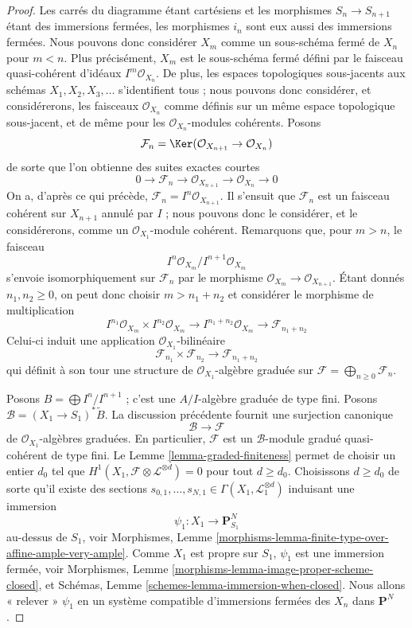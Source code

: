 \begin{proof}
Les carrés du diagramme étant cartésiens et les morphismes
$S_n \to S_{n + 1}$ étant des immersions fermées, les morphismes $i_n$ sont
eux aussi des immersions fermées. Nous pouvons donc considérer $X_m$ comme un
sous-schéma fermé de $X_n$ pour $m < n$. Plus précisément, $X_m$ est le
sous-schéma fermé défini par le faisceau quasi-cohérent d'idéaux
$I^m\mathcal{O}_{X_n}$. De plus, les espaces topologiques sous-jacents aux
schémas $X_1, X_2, X_3, \ldots$ s'identifient tous ; nous pouvons donc
considérer, et considérerons, les faisceaux $\mathcal{O}_{X_n}$ comme définis
sur un même espace topologique sous-jacent, et de même pour les
$\mathcal{O}_{X_n}$-modules cohérents. Posons
$$
\mathcal{F}_n =
\Ker(\mathcal{O}_{X_{n + 1}} \to \mathcal{O}_{X_n})
$$
de sorte que l'on obtienne des suites exactes courtes
$$
0 \to \mathcal{F}_n \to \mathcal{O}_{X_{n + 1}} \to \mathcal{O}_{X_n} \to 0
$$
On a, d'après ce qui précède,
$\mathcal{F}_n = I^n\mathcal{O}_{X_{n + 1}}$. Il s'ensuit que
$\mathcal{F}_n$ est un faisceau cohérent sur $X_{n + 1}$ annulé par $I$ ;
nous pouvons donc le considérer, et le considérerons, comme un
$\mathcal{O}_{X_1}$-module cohérent. Remarquons que, pour $m > n$, le faisceau
$$
I^n\mathcal{O}_{X_m}/I^{n + 1}\mathcal{O}_{X_m}
$$
s'envoie isomorphiquement sur $\mathcal{F}_n$ par le morphisme
$\mathcal{O}_{X_m} \to \mathcal{O}_{X_{n + 1}}$. Étant donnés
$n_1, n_2 \geq 0$, on peut donc choisir $m > n_1 + n_2$ et considérer le
morphisme de multiplication
$$
I^{n_1}\mathcal{O}_{X_m} \times I^{n_2}\mathcal{O}_{X_m}
\longrightarrow
I^{n_1 + n_2}\mathcal{O}_{X_m} \to \mathcal{F}_{n_1 + n_2}
$$
Celui-ci induit une application $\mathcal{O}_{X_1}$-bilinéaire
$$
\mathcal{F}_{n_1} \times \mathcal{F}_{n_2} \longrightarrow
\mathcal{F}_{n_1 + n_2}
$$
qui définit à son tour une structure de $\mathcal{O}_{X_1}$-algèbre graduée
sur $\mathcal{F} = \bigoplus_{n \geq 0} \mathcal{F}_n$.

\medskip\noindent
Posons $B = \bigoplus I^n/I^{n + 1}$ ; c'est une $A/I$-algèbre graduée de
type fini. Posons $\mathcal{B} = (X_1 \to S_1)^*\widetilde{B}$. La discussion
précédente fournit une surjection canonique
$$
\mathcal{B} \longrightarrow \mathcal{F}
$$
de $\mathcal{O}_{X_1}$-algèbres graduées. En particulier,
$\mathcal{F}$ est un $\mathcal{B}$-module gradué quasi-cohérent de type fini.
Le Lemme \ref{lemma-graded-finiteness} permet de choisir un entier $d_0$ tel
que $H^1(X_1, \mathcal{F} \otimes \mathcal{L}^{\otimes d}) = 0$ pour tout
$d \geq d_0$. Choisissons $d \geq d_0$ de sorte qu'il existe des sections
$s_{0, 1}, \ldots, s_{N, 1} \in \Gamma(X_1, \mathcal{L}_1^{\otimes d})$
induisant une immersion
$$
\psi_1 : X_1 \to \mathbf{P}^N_{S_1}
$$
au-dessus de $S_1$, voir Morphismes, Lemme
\ref{morphisms-lemma-finite-type-over-affine-ample-very-ample}. Comme $X_1$
est propre sur $S_1$, $\psi_1$ est une immersion fermée, voir Morphismes,
Lemme \ref{morphisms-lemma-image-proper-scheme-closed}, et Schémas, Lemme
\ref{schemes-lemma-immersion-when-closed}. Nous allons « relever » $\psi_1$
en un système compatible d'immersions fermées des $X_n$ dans
$\mathbf{P}^N$.


\end{proof}
